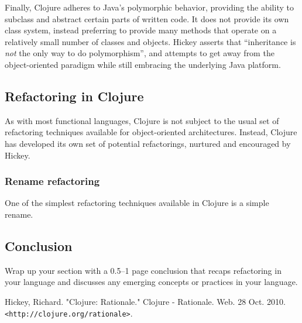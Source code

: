 \documentclass{article}
\begin{document}
Finally, Clojure adheres to Java's polymorphic behavior, providing the ability to subclass and abstract certain parts of written code. It does not provide its own class system, instead preferring to provide many methods that operate on a relatively small number of classes and objects. Hickey asserts that ``inheritance is \textit{not} the only way to do polymorphism''\cite{1}, and attempts to get away from the object-oriented paradigm while still embracing the underlying Java platform.

\subsection{Refactoring in Clojure}

As with most functional languages, Clojure is not subject to the usual set of refactoring techniques available for object-oriented architectures. Instead, Clojure has developed its own set of potential refactorings, nurtured and encouraged by Hickey.

\subsubsection{Rename refactoring}

One of the simplest refactoring techniques available in Clojure is a simple rename. 

\subsection{Conclusion}

Wrap up your section with a 0.5--1 page conclusion that recaps refactoring in your language and discusses any emerging concepts or practices in your language.

\begin{thebibliography}{9}
 Hickey, Richard. "Clojure: Rationale." Clojure - Rationale. Web. 28 Oct. 2010. \verb!<http://clojure.org/rationale>!.
\end{thebibliography}
\end{document}
